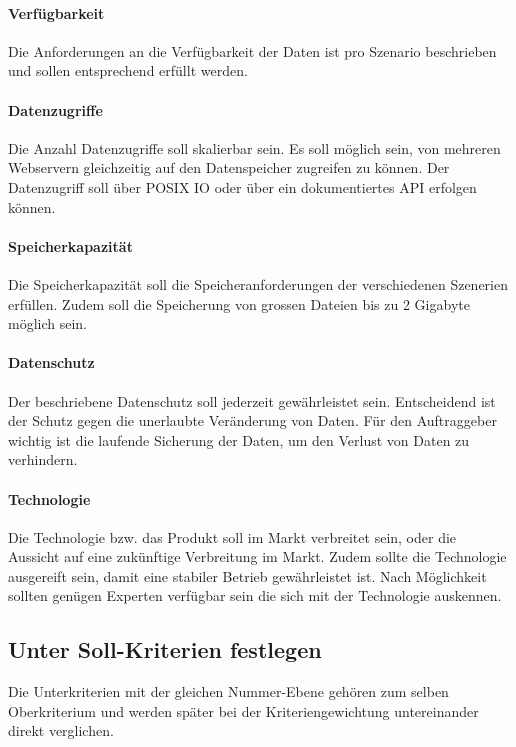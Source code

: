 \paragraph{Verfügbarkeit}\label{Soll-2}
Die Anforderungen an die Verfügbarkeit der Daten ist pro Szenario beschrieben und sollen entsprechend erfüllt werden. 

\paragraph{Datenzugriffe}\label{Soll-3}
Die Anzahl Datenzugriffe soll skalierbar sein. Es soll möglich sein, von mehreren Webservern gleichzeitig auf den Datenspeicher zugreifen zu können. Der Datenzugriff soll über POSIX IO oder über ein dokumentiertes API erfolgen können.

\paragraph{Speicherkapazität}\label{Soll-4}
Die Speicherkapazität soll die Speicheranforderungen der verschiedenen Szenerien erfüllen. Zudem soll die Speicherung von grossen Dateien bis zu 2 Gigabyte möglich sein.

\paragraph{Datenschutz}\label{Soll-5}
Der beschriebene Datenschutz soll jederzeit gewährleistet sein. Entscheidend ist der Schutz gegen die unerlaubte Veränderung von Daten. Für den Auftraggeber wichtig ist die laufende Sicherung der Daten, um den Verlust von Daten zu verhindern.

\paragraph{Technologie}\label{Soll-6}
Die Technologie bzw. das Produkt soll im Markt verbreitet sein, oder die Aussicht auf eine zukünftige Verbreitung im Markt. Zudem sollte die Technologie ausgereift sein, damit eine stabiler Betrieb gewährleistet ist. Nach Möglichkeit sollten genügen Experten verfügbar sein die sich mit der Technologie auskennen.

\subsection{Unter Soll-Kriterien festlegen}
Die Unterkriterien mit der gleichen Nummer-Ebene gehören zum selben Oberkriterium und werden später bei der Kriteriengewichtung untereinander direkt verglichen.

